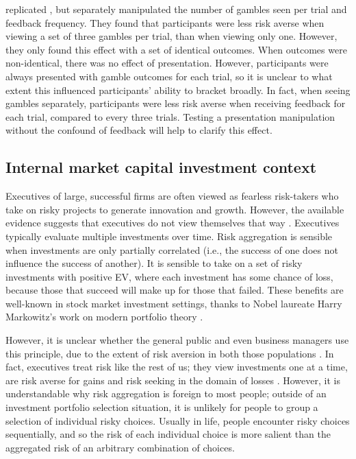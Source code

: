 \documentclass[a4paper, nobind, dvipsnames]{templates/ociamthesis}
\theoremstyle{definition}
\theoremstyle{definition}
\theoremstyle{definition}
\theoremstyle{definition}
\theoremstyle{remark}
\begin{document}
\textcite{moher2010} replicated \textcite{gneezy1997}, but separately manipulated the number of
gambles seen per trial and feedback frequency. They found that participants were
less risk averse when viewing a set of three gambles per trial, than when
viewing only one. However, they only found this effect with a set of identical
outcomes. When outcomes were non-identical, there was no effect of presentation.
However, participants were always presented with gamble outcomes for each trial,
so it is unclear to what extent this influenced participants' ability to bracket
broadly. In fact, when seeing gambles separately, participants were less risk
averse when receiving feedback for each trial, compared to every three trials.
Testing a presentation manipulation without the confound of feedback will help
to clarify this effect.

\subsection{Internal market capital investment context}

Executives of large, successful firms are often viewed as fearless risk-takers
who take on risky projects to generate innovation and growth. However, the
available evidence suggests that executives do not view themselves that way
\autocite{swalm1966,march1987}. Executives typically evaluate multiple investments
over time. Risk aggregation is sensible when investments are only partially
correlated (i.e., the success of one does not influence the success of another).
It is sensible to take on a set of risky investments with positive EV, where
each investment has some chance of loss, because those that succeed will make up
for those that failed. These benefits are well-known in stock market investment
settings, thanks to Nobel laureate Harry Markowitz's work on modern portfolio
theory \autocite*{markowitz1952}.

However, it is unclear whether the general public and even business managers use
this principle, due to the extent of risk aversion in both those populations
\autocites[e.g.,][]{tversky1992,march1987}. In fact, executives treat risk like the rest
of us; they view investments one at a time, are risk averse for gains and risk
seeking in the domain of losses \autocite{maccrimmon1986,swalm1966,lovallo2020}.
However, it is understandable why risk aggregation is foreign to most people;
outside of an investment portfolio selection situation, it is unlikely for
people to group a selection of individual risky choices. Usually in life, people
encounter risky choices sequentially, and so the risk of each individual choice
is more salient than the aggregated risk of an arbitrary combination of choices.
\end{document}
